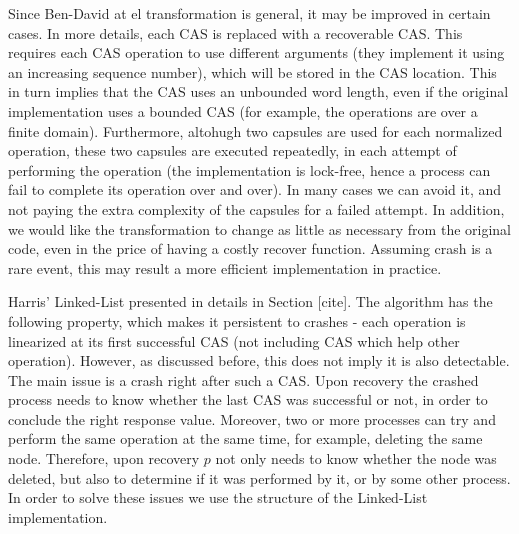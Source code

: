 Since Ben-David at el transformation is general, it may be improved in certain cases. In more details, each CAS is replaced with a recoverable CAS. This requires each CAS operation to use different arguments (they implement it using an increasing sequence number), which will be stored in the CAS location. This in turn implies that the CAS uses an unbounded word length, even if the original implementation uses a bounded CAS (for example, the operations are over a finite domain). Furthermore, altohugh two capsules are used for each normalized operation, these two capsules are executed repeatedly, in each attempt of performing the operation (the implementation is lock-free, hence a process can fail to complete its operation over and over). In many cases we can avoid it, and not paying the extra complexity of the capsules for a failed attempt.
In addition, we would like the transformation to change as little as necessary from the original code, even in the price of having a costly recover function. Assuming crash is a rare event, this may result a more efficient implementation in practice.

Harris' Linked-List presented in details in Section [cite]. The algorithm has the following property, which makes it persistent to crashes - each operation is linearized at its first successful CAS (not including CAS which help other operation). However, as discussed before, this does not imply it is also detectable. The main issue is a crash right after such a CAS. Upon recovery the crashed process needs to know whether the last CAS was successful or not, in order to conclude the right response value. Moreover, two or more processes can try and perform the same operation at the same time, for example, deleting the same node. Therefore, upon recovery $p$ not only needs to know whether the node was deleted, but also to determine if it was performed by it, or by some other process. In order to solve these issues we use the structure of the Linked-List implementation.

